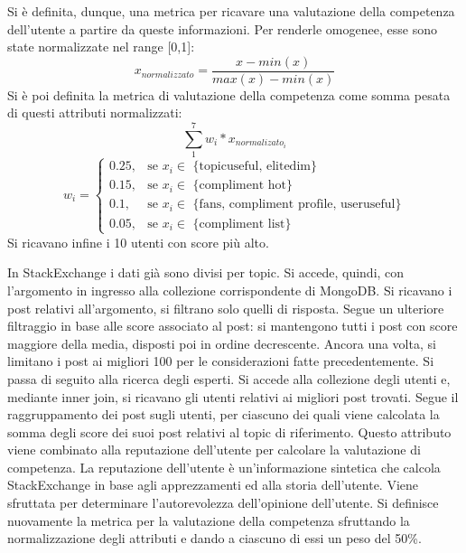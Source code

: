 Si è definita, dunque, una metrica per ricavare una valutazione della competenza dell'utente a partire da queste informazioni. Per renderle omogenee, esse sono state normalizzate nel range [0,1]:
\begin{equation*}
x_{normalizzato} = \frac{x - min(x)}{max(x)-min(x)}
\end{equation*}
Si è poi definita la metrica di valutazione della competenza come somma pesata di questi attributi normalizzati:
\begin{equation*}
\sum_{1}^{7}{w_i*x_{{normalizato}_i}}
\end{equation*}
\begin{equation*}
w_i=\begin{cases} 0.25, & \mbox{se } x_i \in \mbox{ \{topicuseful, elitedim\}}\\ 0.15, & \mbox{se } x_i \in \mbox{ \{compliment hot\}}\\ 0.1, & \mbox{se } x_i \in \mbox{ \{fans, compliment profile, useruseful\}} \\ 0.05, & \mbox{se } x_i \in \mbox{ \{compliment list\}}
\end{cases}
\end{equation*}
Si ricavano infine i 10 utenti con score più alto.\par
In StackExchange i dati già sono divisi per topic. Si accede, quindi, con l'argomento in ingresso alla collezione corrispondente di MongoDB. Si ricavano i post relativi all'argomento, si filtrano solo quelli di risposta. Segue un ulteriore filtraggio in base alle score associato al post: si mantengono tutti i post con score maggiore della media, disposti poi in ordine decrescente. Ancora una volta, si limitano i post ai migliori 100 per le considerazioni fatte precedentemente. Si passa di seguito alla ricerca degli esperti. Si accede alla collezione degli utenti e, mediante inner join, si ricavano gli utenti relativi ai migliori post trovati. Segue il raggruppamento dei post sugli utenti, per ciascuno dei quali viene calcolata la somma degli score dei suoi post relativi al topic di riferimento. Questo attributo viene combinato alla reputazione dell'utente per calcolare la valutazione di competenza. La reputazione dell'utente è un'informazione sintetica che calcola StackExchange in base agli apprezzamenti ed alla storia dell'utente. Viene sfruttata per determinare l'autorevolezza dell'opinione dell'utente. Si definisce nuovamente la metrica per la valutazione della competenza sfruttando la normalizzazione degli attributi e dando a ciascuno di essi un peso del 50\%.

